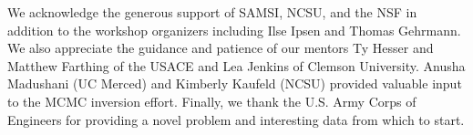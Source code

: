We acknowledge the generous support of SAMSI, NCSU, and the NSF in addition to the workshop organizers including Ilse Ipsen and Thomas Gehrmann. We also appreciate the guidance and patience of our mentors Ty Hesser and Matthew Farthing of the USACE and Lea Jenkins of Clemson University. Anusha Madushani (UC Merced) and Kimberly Kaufeld (NCSU) provided valuable input to the MCMC inversion effort. Finally, we thank the U.S. Army Corps of Engineers for providing a novel problem and interesting data from which to start. 